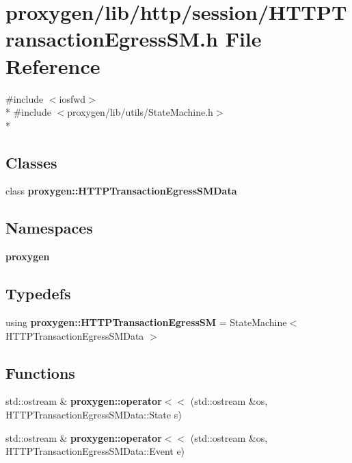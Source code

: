 \section{proxygen/lib/http/session/\+H\+T\+T\+P\+Transaction\+Egress\+SM.h File Reference}
\label{HTTPTransactionEgressSM_8h}
{\ttfamily \#include $<$iosfwd$>$}\\*
{\ttfamily \#include $<$proxygen/lib/utils/\+State\+Machine.\+h$>$}\\*
\subsection*{Classes}
\begin{DoxyCompactItemize}
\item 
class {\bf proxygen\+::\+H\+T\+T\+P\+Transaction\+Egress\+S\+M\+Data}
\end{DoxyCompactItemize}
\subsection*{Namespaces}
\begin{DoxyCompactItemize}
\item 
 {\bf proxygen}
\end{DoxyCompactItemize}
\subsection*{Typedefs}
\begin{DoxyCompactItemize}
\item 
using {\bf proxygen\+::\+H\+T\+T\+P\+Transaction\+Egress\+SM} = State\+Machine$<$ H\+T\+T\+P\+Transaction\+Egress\+S\+M\+Data $>$
\end{DoxyCompactItemize}
\subsection*{Functions}
\begin{DoxyCompactItemize}
\item 
std\+::ostream \& {\bf proxygen\+::operator$<$$<$} (std\+::ostream \&os, H\+T\+T\+P\+Transaction\+Egress\+S\+M\+Data\+::\+State s)
\item 
std\+::ostream \& {\bf proxygen\+::operator$<$$<$} (std\+::ostream \&os, H\+T\+T\+P\+Transaction\+Egress\+S\+M\+Data\+::\+Event e)
\end{DoxyCompactItemize}
